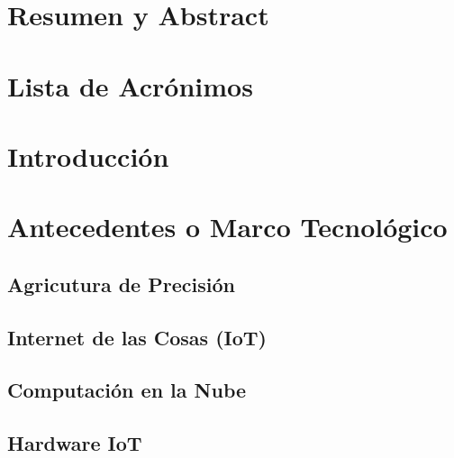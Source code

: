 \documentclass[12pt]{article}
\begin{document}

\thispagestyle{empty}
\newpage

\section*{Resumen y Abstract}

\newpage

\tableofcontents{}
\newpage

\section*{Lista de Acrónimos}

\newpage

\section{Introducción}

\newpage

\section{Antecedentes o Marco Tecnológico}


\subsection{Agricutura de Precisión}


\subsection{Internet de las Cosas (IoT)}


\subsection{Computación en la Nube}


\subsection{Hardware IoT}

\end{document}

